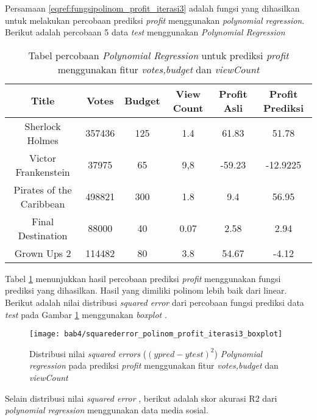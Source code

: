 Persamaan \ref{eqref:fungsipolinom_profit_iterasi3} adalah fungsi yang dihasilkan untuk melakukan percobaan prediksi \textit{profit} menggunakan \textit{polynomial regression}. Berikut adalah percobaan 5 data \textit{test} menggunakan \textit{Polynomial Regression}

\begin{table}[H]
\caption{Tabel percobaan \textit{Polynomial Regression} untuk prediksi \textit{profit} menggunakan fitur \textit{votes,budget} dan \textit{viewCount}} 
\centering
\begin{tabular}{|c|c|c|c|c|c|}
\hline 
Title & Votes & Budget & View Count & Profit Asli & Profit Prediksi \\ 
\hline 
Sherlock Holmes & 357436 & 125 & 1.4 & 61.83 & 51.78 \\ 
\hline 
Victor Frankenstein & 37975 & 65 & 9,8 & -59.23 & -12.9225 \\ 
\hline 
Pirates of the Caribbean & 498821 & 300 & 1.8 & 9.4 & 56.95 \\ 
\hline 
Final Destination & 88000 & 40 & 0.07 & 2.58 & 2.94 \\ 
\hline 
Grown Ups 2 & 114482 & 80 & 3.8 & 54.67 & -4.12 \\ 
\hline 
\end{tabular} 
\label{tab:5sampel_prediksiprofit_polinom_iterasi3}
\end{table}

Tabel \ref{tab:5sampel_prediksiprofit_polinom_iterasi3} menunjukkan hasil percobaan prediksi \textit{profit} menggunakan fungsi prediksi yang dihasilkan. Hasil yang dimiliki polinom lebih baik dari linear. Berikut adalah nilai distribusi \textit{squared error} dari percobaan fungsi prediksi data \textit{test} pada 
Gambar \ref{fig:squarederror_polinom_profit_iterasi3_boxplot} menggunakan \textit{boxplot} .


\begin{figure}[H]
	\centering  
	\texttt{[image: bab4/squarederror\_polinom\_profit\_iterasi3\_boxplot]}   
	\caption{Distribusi nilai \textit{squared errors} ($(ypred-ytest)^2$) \textit{Polynomial regression} pada prediksi \textit{profit} menggunakan fitur \textit{votes,budget} dan \textit{viewCount}}	\label{fig:squarederror_polinom_profit_iterasi3_boxplot} 
\end{figure}

Selain distribusi nilai \textit{squared error}
, berikut adalah skor akurasi R2 dari \textit{polynomial regression} menggunakan data media sosial.

